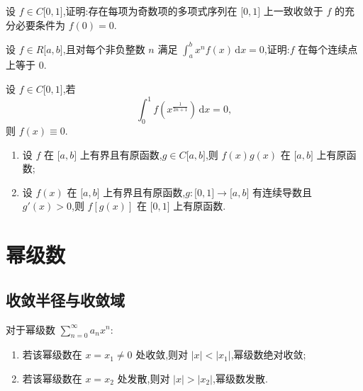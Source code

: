 \documentclass[../数学分析培优讲义.tex]{subfiles}
\begin{document}
\begin{example}
设 $f\in C\lbrack 0,1\rbrack$,证明:存在每项为奇数项的多项式序列在 $\lbrack 0,1\rbrack$ 上一致收敛于 $f$ 的充分必要条件为 $f(0)=0$.
\end{example}
\exampleblank

\begin{example}
设 $f\in R\lbrack a,b\rbrack$,且对每个非负整数 $n$ 满足 $\displaystyle\int_a^bx^nf(x)\,\mathrm{d}x=0$,证明:$f$ 在每个连续点上等于 $0$.
\end{example}
\exampleblank

\begin{example}
设 $f\in C\lbrack 0,1\rbrack$,若
\[
    \int_0^1f\left(x^{\frac{1}{2n+1}}\right)\,\mathrm{d}x=0,
\]
则 $f(x)\equiv0$.
\end{example}
\exampleblank

\begin{example}
\begin{enumerate}[label=(\arabic*)]
    \item 设 $f$ 在 $\lbrack a,b\rbrack$ 上有界且有原函数,$g\in C\lbrack a,b\rbrack$,则 $f(x)g(x)$ 在 $\lbrack a,b\rbrack$ 上有原函数;
    \item 设 $f(x)$ 在 $\lbrack a,b\rbrack$ 上有界且有原函数,$g:\lbrack 0,1\rbrack\to\lbrack a,b\rbrack$ 有连续导数且 $g'(x)>0$,则 $f[g(x)]$ 在 $\lbrack 0,1\rbrack$ 上有原函数.
\end{enumerate}
\end{example}
\exampleblank


\newpage

\section{幂级数}


\subsection{收敛半径与收敛域}

\begin{theorem}[\markstar]
对于幂级数 $\displaystyle\sum\limits_{n=0}^{\infty}a_nx^n$:
\begin{enumerate}[label=(\arabic*)]
    \item 若该幂级数在 $x=x_1\neq0$ 处收敛,则对 $|x|<|x_1|$,幂级数绝对收敛;
    \item 若该幂级数在 $x=x_2$ 处发散,则对 $|x|>|x_2|$,幂级数发散.
\end{enumerate}
\end{theorem}
\end{document}
